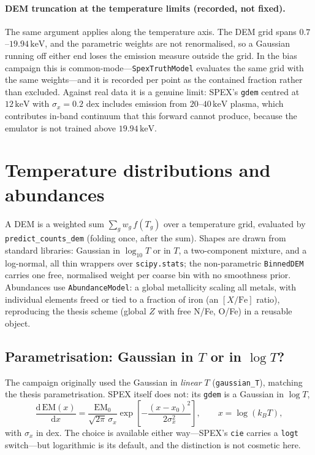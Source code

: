 \documentclass[11pt,a4paper]{article}
\newcommand{\kev}{\,\mathrm{keV}}
\newcommand{\code}[1]{\texttt{#1}}
\begin{document}
\paragraph{DEM truncation at the temperature limits (recorded, not fixed).}
The same argument applies along the temperature axis. The DEM grid spans
$0.7$--$19.94\kev$, and the parametric weights are not renormalised, so a
Gaussian running off either end loses the emission measure outside the grid.
In the bias campaign this is common-mode---\code{SpexTruthModel} evaluates the
same grid with the same weights---and it is recorded per point as the
contained fraction rather than excluded. Against real data it is a genuine
limit: SPEX's \code{gdem} centred at $12\kev$ with $\sigma_x=0.2$ dex includes
emission from $20$--$40\kev$ plasma, which contributes in-band continuum that
this forward cannot produce, because the emulator is not trained above
$19.94\kev$.

\section{Temperature distributions and abundances}\label{sec:dem}
A DEM is a weighted sum $\sum_g w_g\, f(T_g)$ over a temperature grid, evaluated
by \code{predict\_counts\_dem} (folding once, after the sum). Shapes are drawn
from standard libraries: Gaussian in $\log_{10}T$ or in $T$, a two-component
mixture, and a log-normal, all thin wrappers over \code{scipy.stats}; the
non-parametric \code{BinnedDEM} carries one free, normalised weight per coarse
bin with no smoothness prior. Abundances use \code{AbundanceModel}: a global
metallicity scaling all metals, with individual elements freed or tied to a
fraction of iron (an $[X/\mathrm{Fe}]$ ratio), reproducing the thesis scheme
(global $Z$ with free N/Fe, O/Fe) in a reusable object.

\subsection{Parametrisation: Gaussian in $T$ or in $\log T$?}\label{sec:demparam}
The campaign originally used the Gaussian in \emph{linear} $T$
(\code{gaussian\_T}), matching the thesis parametrisation. SPEX itself does not:
its \code{gdem} is a Gaussian in $\log T$,
\begin{equation}
\frac{\mathrm{d}\,\mathrm{EM}(x)}{\mathrm{d}x}
  = \frac{\mathrm{EM}_0}{\sqrt{2\pi}\,\sigma_x}
    \exp\!\left[-\frac{(x-x_0)^2}{2\sigma_x^2}\right],
  \qquad x = \log(k_BT),
\end{equation}
with $\sigma_x$ in dex. The choice is available either way---SPEX's \code{cie}
carries a \code{logt} switch---but logarithmic is its default, and the
distinction is not cosmetic here.
\end{document}
